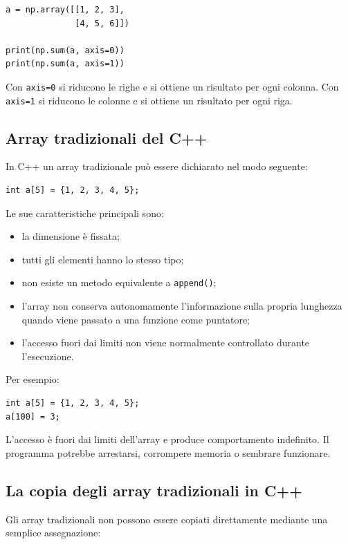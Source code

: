 \documentclass[11pt,a4paper]{book}
\begin{document}
\begin{lstlisting}[style=python]
a = np.array([[1, 2, 3],
              [4, 5, 6]])

print(np.sum(a, axis=0))
print(np.sum(a, axis=1))
\end{lstlisting}

Con \texttt{axis=0} si riducono le righe e si ottiene un risultato per ogni colonna. Con \texttt{axis=1} si riducono le colonne e si ottiene un risultato per ogni riga.

\subsection{Array tradizionali del C++}

In C++ un array tradizionale può essere dichiarato nel modo seguente:

\begin{lstlisting}[style=c++]
int a[5] = {1, 2, 3, 4, 5};
\end{lstlisting}

Le sue caratteristiche principali sono:

\begin{itemize}
    \item la dimensione è fissata;
    \item tutti gli elementi hanno lo stesso tipo;
    \item non esiste un metodo equivalente a \texttt{append()};
    \item l'array non conserva autonomamente l'informazione sulla propria lunghezza quando viene passato a una funzione come puntatore;
    \item l'accesso fuori dai limiti non viene normalmente controllato durante l'esecuzione.
\end{itemize}

Per esempio:

\begin{lstlisting}[style=c++]
int a[5] = {1, 2, 3, 4, 5};
a[100] = 3;
\end{lstlisting}

L'accesso è fuori dai limiti dell'array e produce comportamento indefinito. Il programma potrebbe arrestarsi, corrompere memoria o sembrare funzionare.

\subsection{La copia degli array tradizionali in C++}

Gli array tradizionali non possono essere copiati direttamente mediante una semplice assegnazione:
\end{document}
